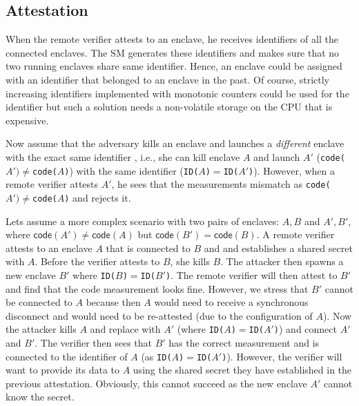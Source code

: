 \subsection{Attestation} 

When the remote verifier attests to an enclave, he receives identifiers of all the connected enclaves. The SM generates these identifiers and makes sure that no two running enclaves share same identifier. Hence, an enclave could be assigned with an identifier that belonged to an enclave in the past. Of course, strictly increasing identifiers implemented with monotonic counters could be used for the identifier but such a solution needs a non-volatile storage on the CPU that is expensive. 

Now assume that the adversary kills an enclave and launches a \emph{different} enclave with the exact same identifier , i.e., she can kill enclave $A$ and launch $A'$ (\texttt{code($A')\neq$code($A$)}) with the same identifier (\texttt{ID($A$)$=$ID($A'$)}). However, when a remote verifier attests $A'$, he sees that the measurements mismatch as \texttt{code($A')\neq$code($A$)} and rejects it.

Lets assume a more complex scenario with two pairs of enclaves: $A, B$ and $A', B'$, where $\textsf{code} (A')\neq \textsf{code} (A)$ but $\textsf{code} (B') = \textsf{code} (B)$. 
A remote verifier attests to an enclave $A$ that is connected to $B$ and and establishes a shared secret with $A$. Before the verifier attests to $B$, she kills $B$. The attacker then spawns a new enclave $B'$ where \texttt{ID($B$)$=$ID($B'$)}. The remote verifier will then attest to $B'$ and find that the code measurement looks fine. However, we stress that $B'$ cannot be connected to $A$ because then $A$ would need to receive a synchronous disconnect and would need to be re-attested (due to the configuration of $A$). Now the attacker kills $A$ and replace with $A'$ (where \texttt{ID($A$)$=$ID($A'$)}) and connect $A'$ and $B'$. The verifier then sees that $B'$ has the correct measurement and is connected to the identifier of $A$ (as \texttt{ID($A$)$=$ID($A'$)}). However, the verifier will want to provide its data to $A$ using the shared secret they have established in the previous attestation. Obviously, this cannot succeed as the new enclave $A'$ cannot know the secret.
 
